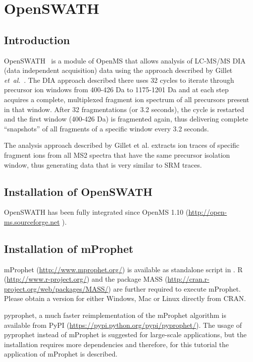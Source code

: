 
\newpage
\section{OpenSWATH}
\subsection{Introduction}

OpenSWATH~\cite{Rost2014fd} is a module of OpenMS that allows analysis of LC-MS/MS DIA (data independent acquisition) data using the approach described by Gillet \textit{et~al.}~\cite{Gillet2012Targeted}. The DIA approach described there uses 32 cycles to iterate through precursor ion windows from 400-426 Da to 1175-1201 Da and at each step acquires a complete, multiplexed fragment ion spectrum of all precursors present in that window. After 32 fragmentations (or 3.2 seconds), the cycle is restarted and the first window (400-426 Da) is fragmented again, thus delivering complete ``snapshots'' of all fragments of a specific window every 3.2 seconds.

The analysis approach described by Gillet et al. extracts ion traces of specific fragment ions from all MS2 spectra that have the same precursor isolation window, thus generating data that is very similar to SRM traces.

\subsection{Installation of OpenSWATH}
OpenSWATH has been fully integrated since OpenMS 1.10 (\url{http://open-ms.sourceforge.net} \cite{Kohlbacher2007,Sturm2008,Bertsch2011OpenMS}).

\subsection{Installation of mProphet}
mProphet (\url{http://www.mprophet.org/}) \cite{Reiter2011MProphet} is available as standalone script in . 
R (\url{http://www.r-project.org/}) and the package MASS (\url{http://cran.r-project.org/web/packages/MASS/}) are further required to execute mProphet. 
Please obtain a version for either Windows, Mac or Linux directly from CRAN.

pyprophet, a much faster reimplementation of the mProphet algorithm is available from PyPI (\url{https://pypi.python.org/pypi/pyprophet/}). The usage of pyprophet instead of mProphet is suggested for large-scale applications, but the installation requires more dependencies and therefore, for this tutorial the application of mProphet is described.

